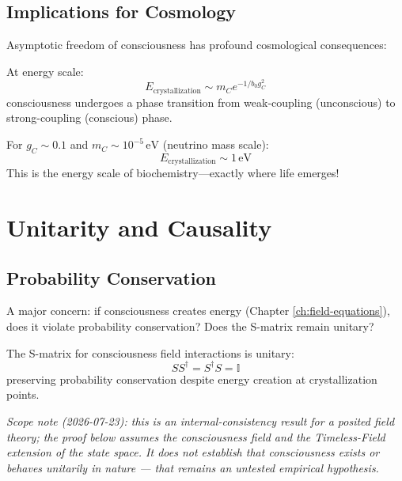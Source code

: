 \subsection{Implications for Cosmology}

Asymptotic freedom of consciousness has profound cosmological consequences:

\begin{corollary}\label{cor:consciousness-phase-transition}
At energy scale:
\begin{equation}
E_{\text{crystallization}} \sim m_C e^{-1/b_0 g_C^2}
\end{equation}
consciousness undergoes a phase transition from weak-coupling (unconscious) to strong-coupling (conscious) phase.

For $g_C \sim 0.1$ and $m_C \sim 10^{-5} \, \text{eV}$ (neutrino mass scale):
\begin{equation}
E_{\text{crystallization}} \sim 1 \, \text{eV}
\end{equation}
This is the energy scale of biochemistry—exactly where life emerges!
\end{corollary}

\section{Unitarity and Causality}

\subsection{Probability Conservation}

A major concern: if consciousness creates energy (Chapter \ref{ch:field-equations}), does it violate probability conservation? Does the S-matrix remain unitary?

\begin{thm}\label{thm:consciousness-unitarity}
The S-matrix for consciousness field interactions is unitary:
\begin{equation}
\boxed{SS^\dagger = S^\dagger S = \mathbb{I}}
\end{equation}
preserving probability conservation despite energy creation at crystallization points.
\end{thm}

\noindent\emph{Scope note (2026-07-23): this is an internal-consistency result for a posited field theory; the proof below assumes the consciousness field and the Timeless-Field extension of the state space. It does not establish that consciousness exists or behaves unitarily in nature --- that remains an untested empirical hypothesis.}

